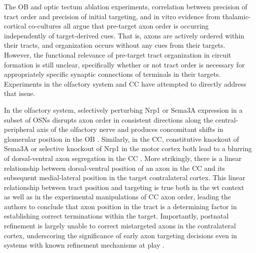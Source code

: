 The OB and optic tectum ablation experiments, correlation between precision of tract order and precision of initial targeting, and in vitro evidence from thalamic-cortical co-cultures all argue that pre-target axon order is occurring independently of target-derived cues.
That is, axons are actively ordered within their tracts, and organization occurs without any cues from their targets.
However, the functional relevance of pre-target tract organization in circuit formation is still unclear, specifically whether or not tract order is necessary for appropriately specific synaptic connections of terminals in their targets.
Experiments in the olfactory system and CC have attempted to directly address that issue.

In the olfactory system, selectively perturbing Nrp1 or Sema3A expression in a subset of OSNs disrupts axon order in consistent directions along the central-peripheral axis of the olfactory nerve and produces concomitant shifts in glomerular position in the OB \cite{imai2009pre}.
Similarly, in the CC, constitutive knockout of Sema3A or selective knockout of Nrp1 in the motor cortex both lead to a blurring of dorsal-ventral axon segregation in the CC \cite{zhou2013axon}.
More strikingly, there is a linear relationship between dorsal-ventral position of an axon in the CC and its subsequent medial-lateral position in the target contralateral cortex.
This linear relationship between tract position and targeting is true both in the wt context as well as in the experimental manipulations of CC axon order, leading the authors to conclude that axon position in the tract is a determining factor in establishing correct terminations within the target.
Importantly, postnatal refinement is largely unable to correct mistargeted axons in the contralateral cortex, underscoring the significance of early axon targeting decisions even in systems with known refinement mechanisms at play \cite{zhou2013axon}.

